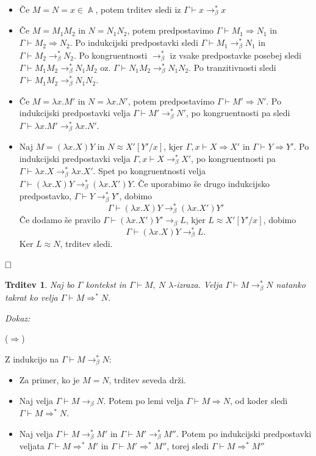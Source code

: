 \documentclass{article}
\DeclareMathOperator{\Atoms}{\mathds{A}}
\def\qed{$\hfill\Box$}   %
\newtheorem{trditev}{Trditev}
\begin{document}
\begin{itemize}
    \item Če \(M = N = x \in \Atoms\), potem trditev sledi iz \(\Gamma \vdash x \rightarrow_\beta^* x\)
    \item Če \(M = M_1 M_2\) in \(N = N_1 N_2\), potem predpostavimo \(\Gamma \vdash M_1 \Rightarrow N_1\) in \(\Gamma \vdash M_2 \Rightarrow N_2\). Po indukcijski predpostavki sledi \(\Gamma \vdash M_1 \rightarrow_\beta^* N_1\) in \(\Gamma \vdash M_2 \rightarrow_\beta^* N_2\). Po kongruentnosti \(\rightarrow_\beta^*\) iz vsake predpostavke posebej sledi \(\Gamma \vdash M_1 M_2 \rightarrow_\beta^* N_1 M_2\) oz. \(\Gamma \vdash N_1 M_2 \rightarrow_\beta^* N_1 N_2\). Po tranzitivnosti sledi \(\Gamma \vdash M_1 M_2 \rightarrow_\beta^* N_1 N_2\).
    \item Če \(M = \lambda x. M'\) in \(N = \lambda x. N'\), potem predpostavimo \(\Gamma \vdash M' \Rightarrow N'\). Po indukcijski predpostavki velja \(\Gamma \vdash M' \rightarrow_\beta^* N'\), po kongruentnosti pa sledi \(\Gamma \vdash \lambda x.M' \rightarrow_\beta^* \lambda x.N'\).
    \item Naj \(M = (\lambda x. X)Y\) in \(N \approx X'[Y'/x]\), kjer \(\Gamma, x \vdash X \Rightarrow X'\) in \(\Gamma \vdash Y \Rightarrow Y'\). Po indukcijski predpostavki velja \(\Gamma, x \vdash X \rightarrow_\beta^* X'\), po kongruentnosti pa \(\Gamma \vdash \lambda x. X \rightarrow_\beta^* \lambda x. X'\). Spet po kongruentnosti velja \(\Gamma \vdash (\lambda x. X)Y \rightarrow_\beta^* (\lambda x. X')Y\). Če uporabimo še drugo indukcijsko predpostavko, \(\Gamma \vdash Y \rightarrow_\beta^* Y'\), dobimo 
    \[\Gamma \vdash (\lambda x. X)Y \rightarrow_\beta^* (\lambda x. X') Y'\]
    Če dodamo še pravilo \(\Gamma \vdash (\lambda x.X') Y' \rightarrow_\beta L\), kjer \(L \approx X'[Y'/x]\), dobimo \[
        \Gamma \vdash (\lambda x. X)Y \rightarrow_\beta^* L.
    \]
    Ker \(L \approx N\), trditev sledi.
\end{itemize}

\qed


\begin{trditev}
    Naj bo \(\Gamma\) kontekst in \(\Gamma \vdash M,\ N\) \(\lambda\)-izraza. Velja \(\Gamma \vdash M \rightarrow_\beta^* N\) natanko takrat ko velja \(\Gamma \vdash M \Rightarrow^* N\).
\end{trditev}
\noindent
{\em Dokaz:\/}

(\(\Rightarrow\))

Z indukcijo na \(\Gamma \vdash M \rightarrow_\beta^* N\):
\begin{itemize}
    \item Za primer, ko je \(M = N\), trditev seveda drži.
    \item Naj velja \(\Gamma \vdash M \rightarrow_\beta N\). Potem po lemi velja \(\Gamma \vdash M \Rightarrow N\), od koder sledi \(\Gamma \vdash M \Rightarrow^* N\).
    \item Naj velja \(\Gamma \vdash M \rightarrow_\beta^* M'\) in \(\Gamma \vdash M' \rightarrow_\beta^* M''\). Potem po indukcijski predpostavki veljata \(\Gamma \vdash M \Rightarrow^* M'\) in \(\Gamma \vdash M' \Rightarrow^* M''\), torej sledi \(\Gamma \vdash M \Rightarrow^* M''\)
\end{itemize}
\end{document}
